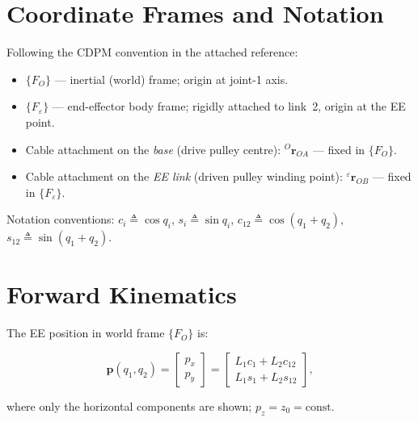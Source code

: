 \documentclass[12pt, a4paper]{article}
\theoremstyle{definition}
\newcommand{\bp}{\bm{p}}
\newcommand{\cq}[1]{c_{#1}}   %
\newcommand{\sq}[1]{s_{#1}}   %
\newcommand{\cqq}[2]{c_{{#1}{#2}}}  %
\newcommand{\sqq}[2]{s_{{#1}{#2}}}  %
\newcommand{\FO}{\{F_O\}}      %
\newcommand{\FE}{\{F_\varepsilon\}} %
\begin{document}
\section{Coordinate Frames and Notation}
\label{sec:frames}

Following the CDPM convention in the attached reference:

\begin{itemize}
  \item $\FO$ --- inertial (world) frame; origin at joint-1 axis.
  \item $\FE$ --- end-effector body frame; rigidly attached to link~2, origin at
        the EE point.
  \item Cable attachment on the \emph{base} (drive pulley centre):
        ${}^O\bm{r}_{OA}$ --- fixed in $\FO$.
  \item Cable attachment on the \emph{EE link} (driven pulley winding point):
        ${}^\varepsilon\bm{r}_{OB}$ --- fixed in $\FE$.
\end{itemize}

\noindent
Notation conventions:
$c_i \triangleq \cos q_i$,\;
$s_i \triangleq \sin q_i$,\;
$c_{12} \triangleq \cos(q_1 + q_2)$,\;
$s_{12} \triangleq \sin(q_1 + q_2)$.

\section{Forward Kinematics}
\label{sec:fk}

The EE position in world frame $\FO$ is:

\begin{equation}
  \label{eq:fk}
  \bp(q_1, q_2) =
  \begin{bmatrix}
    p_x \\ p_y
  \end{bmatrix}
  =
  \begin{bmatrix}
    L_1 \cq{1} + L_2 \cqq{1}{2} \\
    L_1 \sq{1} + L_2 \sqq{1}{2}
  \end{bmatrix},
\end{equation}

where only the horizontal components are shown; $p_z = z_0 = \text{const}$.
\end{document}
